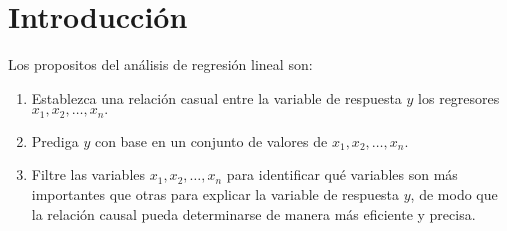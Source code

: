 \chapter{Introducción}

Los propositos del análisis de regresión lineal son:
\begin{enumerate}[(1)]
    \item Establezca una relación casual entre la variable de respuesta  $y$ los regresores $x_1, x_2, \ldots , x_n.$ 
    \item Prediga $y$ con base en un conjunto de valores de $x_1, x_2, \ldots , x_n.$
    \item Filtre las variables $x_1, x_2, \ldots , x_n$ para identificar qué variables son más importantes que otras para explicar la variable de respuesta $y$, de modo que la relación causal pueda determinarse de manera más eficiente y precisa.
\end{enumerate}
